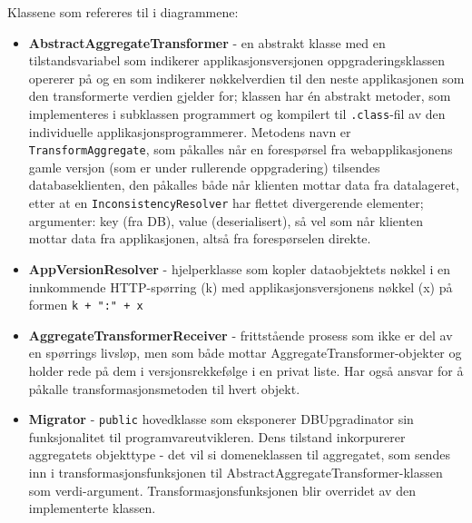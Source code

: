 Klassene som refereres til i diagrammene:
\begin{itemize}
  \item \textbf{AbstractAggregateTransformer} - en abstrakt klasse med en tilstandsvariabel som indikerer applikasjonsversjonen oppgraderingsklassen opererer på og en som indikerer nøkkelverdien til den neste applikasjonen som den transformerte verdien gjelder for; klassen har én abstrakt metoder, som implementeres i subklassen programmert og kompilert til \texttt{.class}-fil av den individuelle applikasjonsprogrammerer. Metodens navn er \texttt{TransformAggregate}, som påkalles når en forespørsel fra webapplikasjonens gamle versjon (som er under rullerende oppgradering) tilsendes databaseklienten, den påkalles både når klienten mottar data fra datalageret, etter at en \texttt{InconsistencyResolver} har flettet divergerende elementer; argumenter: key (fra DB), value (deserialisert), så vel som når klienten mottar data fra applikasjonen, altså fra forespørselen direkte.
  \item \textbf{AppVersionResolver} - hjelperklasse som kopler dataobjektets nøkkel i en innkommende HTTP-spørring (k) med applikasjonsversjonens nøkkel (x) på formen \texttt{k + ":" + x}
  \item \textbf{AggregateTransformerReceiver} - frittstående prosess som ikke er del av en spørrings livsløp, men som både mottar AggregateTransformer-objekter og holder rede på dem i versjonsrekkefølge i en privat liste. Har også ansvar for å påkalle transformasjonsmetoden til hvert objekt.
  \item \textbf{Migrator} - \texttt{public} hovedklasse som eksponerer DBUpgradinator sin funksjonalitet til programvareutvikleren. Dens tilstand inkorpurerer aggregatets objekttype - det vil si domeneklassen til aggregatet, som sendes inn i transformasjonsfunksjonen til AbstractAggregateTransformer-klassen som verdi-argument. Transformasjonsfunksjonen blir overridet av den implementerte klassen.
\end{itemize}

\newpage

